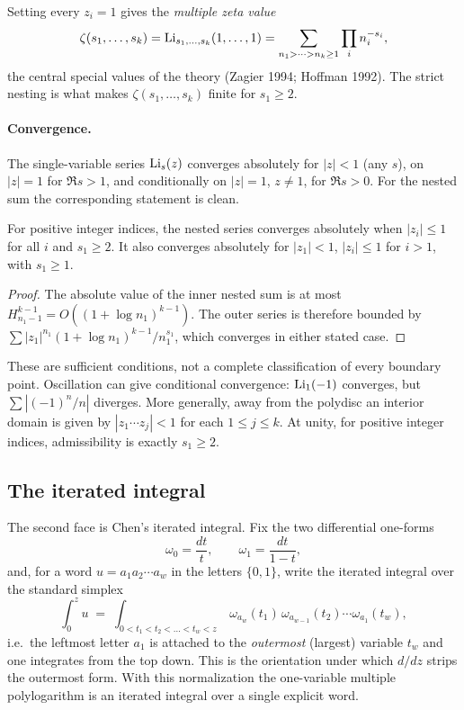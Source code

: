 \begin{remark}
Setting every $z_i=1$ gives the \emph{multiple zeta value}
\[
  \zeta(s_1,\dots,s_k)=\operatorname{Li}_{s_1,\dots,s_k}(1,\dots,1)
  =\sum_{n_1>\dots>n_k\ge1}\prod_i n_i^{-s_i},
\]
the central special values of the theory (Zagier 1994; Hoffman 1992). The strict nesting is what makes $\zeta(s_1,\dots,s_k)$ finite for $s_1\ge2$.
\end{remark}

\paragraph{Convergence.} The single-variable series $\operatorname{Li}_s(z)$ converges absolutely for $|z|<1$ (any $s$), on $|z|=1$ for $\Re s>1$, and conditionally on $|z|=1$, $z\ne1$, for $\Re s>0$. For the nested sum the corresponding statement is clean.

\begin{proposition}
For positive integer indices, the nested series converges absolutely when
$|z_i|\le1$ for all $i$ and $s_1\ge2$. It also converges absolutely for
$|z_1|<1$, $|z_i|\le1$ for $i>1$, with $s_1\ge1$.
\end{proposition}
\begin{proof}
The absolute value of the inner nested sum is at most
$H_{n_1-1}^{k-1}=O((1+\log n_1)^{k-1})$.
The outer series is therefore bounded by
$\sum |z_1|^{n_1}(1+\log n_1)^{k-1}/n_1^{s_1}$,
which converges in either stated case.
\end{proof}
These are sufficient conditions, not a complete classification of every
boundary point. Oscillation can give conditional convergence: $\operatorname{Li}_1(-1)$
converges, but $\sum |(-1)^n/n|$ diverges. More generally, away from the
polydisc an interior domain is given by
$|z_1\cdots z_j|<1$ for each $1\le j\le k$.
At unity, for positive integer indices, admissibility is exactly $s_1\ge2$.

\subsection{The iterated integral}

The second face is Chen's iterated integral. Fix the two differential one-forms
\[
  \omega_0=\frac{dt}{t},\qquad \omega_1=\frac{dt}{1-t},
\]
and, for a word $u=a_1a_2\cdots a_w$ in the letters $\{0,1\}$, write the iterated integral over the standard simplex
\[
  \int_0^z u \;=\; \int_{0<t_1<t_2<\dots<t_w<z}\ \omega_{a_w}(t_1)\,\omega_{a_{w-1}}(t_2)\cdots\omega_{a_1}(t_w),
\]
i.e.\ the leftmost letter $a_1$ is attached to the \emph{outermost} (largest) variable $t_w$ and one integrates from the top down. This is the orientation under which $d/dz$ strips the outermost form. With this normalization the one-variable multiple polylogarithm is an iterated integral over a single explicit word.

